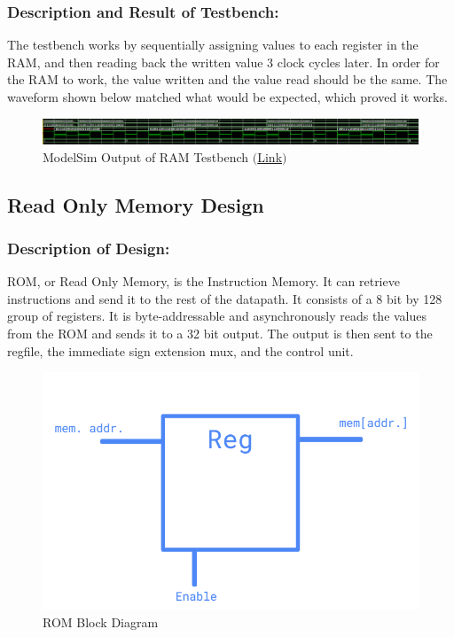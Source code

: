 \documentclass[10pt,letterpaper]{article}
\begin{document}
\subsubsection{Description and Result of Testbench:}
The testbench works by sequentially assigning values to each register in the RAM, and then reading back the written value 3 clock cycles later. In order for the RAM to work, the value written and the value read should be the same. The waveform shown below matched what would be expected, which proved it works.
\begin{figure}[H]
	\centering
	\includegraphics[width=\linewidth]{Figures/RAMTB}
	\caption{ModelSim Output of RAM Testbench \href{https://drive.google.com/file/d/15GmUSFXMRlqQpSEvOUH-_ZZlNqyp-V3_/view?usp=sharing}{$($Link$)$}}
	\label{fig:ramtb}
\end{figure}

\newpage
\subsection{Read Only Memory Design}
\subsubsection{Description of Design:}
ROM, or Read Only Memory, is the Instruction Memory. It can retrieve instructions and send it to the rest of the datapath. It consists of a 8 bit by 128 group of registers. It is byte-addressable and asynchronously reads the values from the ROM and sends it to a 32 bit output. The output is then sent to the regfile, the immediate sign extension mux, and the control unit.
\begin{figure}[H]
	\centering
	\includegraphics[width=0.7\linewidth]{Figures/ROMDesign}
	\caption{ROM Block Diagram}
	\label{fig:romdesign}
\end{figure}
\end{document}
